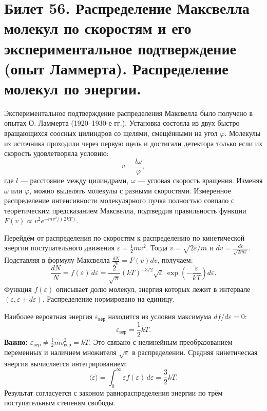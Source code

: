 \section{Билет 56. Распределение Максвелла молекул по скоростям и его экспериментальное подтверждение (опыт Ламмерта). Распределение молекул по энергии.}

\begin{definition}
Экспериментальное подтверждение распределения Максвелла было получено в опытах О. Ламмерта (1920--1930-е гг.). Установка состояла из двух быстро вращающихся соосных цилиндров со щелями, смещёнными на угол $\varphi$. Молекулы из источника проходили через первую щель и достигали детектора только если их скорость удовлетворяла условию:
\begin{equation}
    v = \frac{l \omega}{\varphi},
\end{equation}
где $l$ --- расстояние между цилиндрами, $\omega$ --- угловая скорость вращения. Изменяя $\omega$ или $\varphi$, можно выделять молекулы с разными скоростями. Измеренное распределение интенсивности молекулярного пучка полностью совпало с теоретическим предсказанием Максвелла, подтвердив правильность функции $F(v) \propto v^2 e^{-mv^2/(2kT)}$.
\end{definition}

\begin{theorem}
Перейдём от распределения по скоростям к распределению по кинетической энергии поступательного движения $\varepsilon = \frac{1}{2} m v^2$. Тогда $v = \sqrt{2\varepsilon/m}$ и $dv = \frac{d\varepsilon}{\sqrt{2m\varepsilon}}$. Подставляя в формулу Максвелла $\frac{dN}{N} = F(v) dv$, получаем:
\begin{equation}
    \frac{dN}{N} = f(\varepsilon) \, d\varepsilon = \frac{2}{\sqrt{\pi}} (kT)^{-3/2} \sqrt{\varepsilon} \, \exp\left( -\frac{\varepsilon}{kT} \right) d\varepsilon. \label{eq:energy_dist_56}
\end{equation}
Функция $f(\varepsilon)$ описывает долю молекул, энергия которых лежит в интервале $(\varepsilon, \varepsilon+d\varepsilon)$. Распределение нормировано на единицу.
\end{theorem}

\begin{property}
Наиболее вероятная энергия $\varepsilon_{\text{вер}}$ находится из условия максимума $df/d\varepsilon = 0$:
\begin{equation}
    \varepsilon_{\text{вер}} = \frac{1}{2} kT. \label{eq:most_prob_energy_56}
\end{equation}
\textbf{Важно:} $\varepsilon_{\text{вер}} \neq \frac{1}{2} m v_{\text{вер}}^2 = kT$. Это связано с нелинейным преобразованием переменных и наличием множителя $\sqrt{\varepsilon}$ в распределении.
Средняя кинетическая энергия вычисляется интегрированием:
\begin{equation}
    \langle \varepsilon \rangle = \int_0^\infty \varepsilon f(\varepsilon) \, d\varepsilon = \frac{3}{2} kT. \label{eq:avg_energy_56}
\end{equation}
Результат согласуется с законом равнораспределения энергии по трём поступательным степеням свободы.
\end{property}

